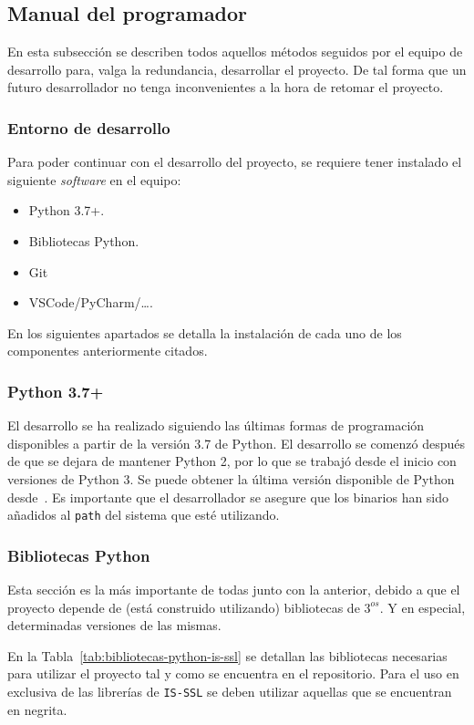 \subsection{Manual del programador}
En esta subsección se describen todos aquellos métodos seguidos por el equipo de desarrollo para, valga la redundancia, desarrollar el proyecto. De tal forma que un futuro desarrollador no tenga inconvenientes a la hora de retomar el proyecto.

\subsubsection{Entorno de desarrollo}
Para poder continuar con el desarrollo del proyecto, se requiere tener instalado el siguiente \textit{software} en el equipo:
\begin{itemize}
\tightlist
\item Python 3.7+.
\item Bibliotecas Python.
\item Git
\item VSCode/PyCharm/\dots.
\end{itemize}

En los siguientes apartados se detalla la instalación de cada uno de los componentes anteriormente citados.

\subsubsection{Python 3.7+}
El desarrollo se ha realizado siguiendo las últimas formas de programación disponibles a partir de la versión 3.7 de Python. El desarrollo se comenzó después de que se dejara de mantener Python 2, por lo que se trabajó desde el inicio con versiones de Python 3. Se puede obtener la última versión disponible de Python desde~\cite{pythonGetIt}. Es importante que el desarrollador se asegure que los binarios han sido añadidos al \texttt{path} del sistema que esté utilizando.

\subsubsection{Bibliotecas Python}
Esta sección es la más importante de todas junto con la anterior, debido a que el proyecto depende de (está construido utilizando) bibliotecas de $3^{os}$. Y en especial, determinadas versiones de las mismas. 

En la Tabla~\ref{tab:bibliotecas-python-is-ssl} se detallan las bibliotecas necesarias para utilizar el proyecto tal y como se encuentra en el repositorio. Para el uso en exclusiva de las librerías de \texttt{IS-SSL} se deben utilizar aquellas que se encuentran en negrita.

